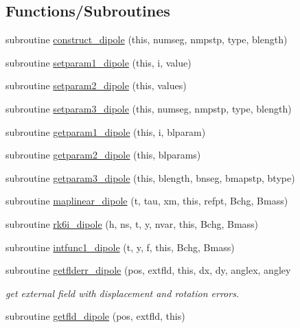 \subsection*{Functions/\+Subroutines}
\begin{DoxyCompactItemize}
\item 
subroutine \mbox{\hyperlink{namespacedipoleclass_ad926e6953a9110fb9662f9d75aec0578}{construct\+\_\+dipole}} (this, numseg, nmpstp, type, blength)
\item 
subroutine \mbox{\hyperlink{namespacedipoleclass_a88c00f58bdecf1b9c087e1fa6fe4d890}{setparam1\+\_\+dipole}} (this, i, value)
\item 
subroutine \mbox{\hyperlink{namespacedipoleclass_af9b4f7bb26e407880166d1b7d19f8877}{setparam2\+\_\+dipole}} (this, values)
\item 
subroutine \mbox{\hyperlink{namespacedipoleclass_a46e12e75054e010d776e23895101e223}{setparam3\+\_\+dipole}} (this, numseg, nmpstp, type, blength)
\item 
subroutine \mbox{\hyperlink{namespacedipoleclass_af02462235721b966a71753610096e85a}{getparam1\+\_\+dipole}} (this, i, blparam)
\item 
subroutine \mbox{\hyperlink{namespacedipoleclass_af793a317f0b5d337d6818755609641a7}{getparam2\+\_\+dipole}} (this, blparams)
\item 
subroutine \mbox{\hyperlink{namespacedipoleclass_a6a7322bcea3d9d07affd0628002985fd}{getparam3\+\_\+dipole}} (this, blength, bnseg, bmapstp, btype)
\item 
subroutine \mbox{\hyperlink{namespacedipoleclass_a3388afe517788e8b824b96bf49793510}{maplinear\+\_\+dipole}} (t, tau, xm, this, refpt, Bchg, Bmass)
\item 
subroutine \mbox{\hyperlink{namespacedipoleclass_a1a92cd51d6ad864d251dd3abdc361ba8}{rk6i\+\_\+dipole}} (h, ns, t, y, nvar, this, Bchg, Bmass)
\item 
subroutine \mbox{\hyperlink{namespacedipoleclass_ab15f3a0defc0de419f5613659abc9cad}{intfunc1\+\_\+dipole}} (t, y, f, this, Bchg, Bmass)
\item 
subroutine \mbox{\hyperlink{namespacedipoleclass_a0a75204835a2e4dd1ea67c1ee32e62fe}{getflderr\+\_\+dipole}} (pos, extfld, this, dx, dy, anglex, angley
\begin{DoxyCompactList}\small\item\em get external field with displacement and rotation errors. \end{DoxyCompactList}\item 
subroutine \mbox{\hyperlink{namespacedipoleclass_ac8c755e07904e113f223ee5ef029ac93}{getfld\+\_\+dipole}} (pos, extfld, this)

\end{DoxyCompactItemize}
